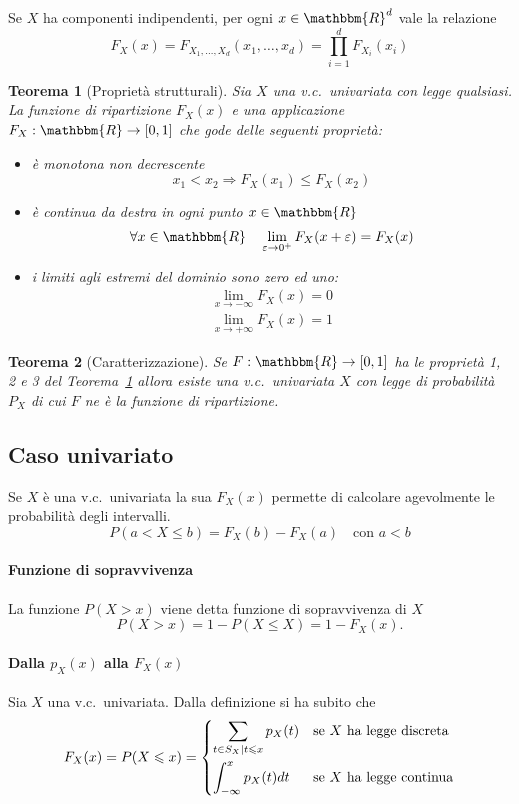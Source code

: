 \documentclass[11pt,a4paper,twoside]{article}
\newtheorem{theorem}{Teorema}
\let\epsilon\varepsilon%
\let\leq\leqslant%
\newcommand\R{\mathbbm{R}}
\begin{document}
Se \(X\) ha componenti indipendenti, per ogni \(x\in\R^d\) vale la
relazione
\[
  F_X(x) = F_{X_1,\dots,X_d} (x_1, \dots, x_d) = \prod_{i=1}^d F_{X_i}(x_i)
\]

\begin{theorem}[Proprietà strutturali]\label{th:proprietà-strutturali}
  Sia \(X\) una v.c.\ univariata con legge qualsiasi.  La funzione di
  ripartizione \(F_X(x)\) e una applicazione \(F_X : \R\to [0,1]\) che
  gode delle seguenti proprietà:
  \begin{itemize}
  \item è monotona non decrescente
    \[ x_1 < x_2 \Rightarrow F_X(x_1) \leq F_X(x_2) \]
  \item è continua da destra in ogni punto \(x\in\R\)
    \[ \forall x\in\R \quad \lim_{\epsilon\to 0^+} F_X(x+\epsilon) = F_X(x) \]
  \item i limiti agli estremi del dominio sono zero ed uno:
    \begin{align*}
      \lim_{x\to -\infty} F_X(x) = 0 \\
      \lim_{x\to +\infty} F_X(x) = 1
    \end{align*}
  \end{itemize}
\end{theorem}

\begin{theorem}[Caratterizzazione]\label{teorema-di-caratterizzazione}
  Se \(F : \R\to[0,1]\) ha le proprietà 1, 2 e 3 del
  Teorema~\ref{th:proprietà-strutturali} allora esiste una v.c.\
  univariata \(X\) con legge di probabilità \(P_X\) di cui \(F\) ne è
  la funzione di ripartizione.
\end{theorem}

\subsection{Caso univariato}
Se \(X\) è una v.c.\ univariata la sua \(F_X(x)\) permette di
calcolare agevolmente le probabilità degli intervalli.
\[
  P(a < X \leq b) = F_X(b) - F_X(a) \quad\mbox{con } a < b
\]

\paragraph{Funzione di sopravvivenza} La funzione \(P(X>x)\) viene
detta funzione di sopravvivenza di \(X\)
\[
  P(X>x) = 1 - P(X\leq X) = 1 - F_X(x).
\]

\paragraph{Dalla \(p_X(x)\) alla \(F_X(x)\)} Sia \(X\) una v.c.\
univariata.  Dalla definizione si ha subito che
\[
  F_X(x) = P(X\leq x) = \begin{dcases}
    \sum_{t\in S_X \mid t\leq x} p_X(t) & \mbox{se \(X\) ha legge discreta} \\
    \int_{-\infty}^x p_X(t) dt & \mbox{se \(X\) ha legge continua}
  \end{dcases}
\]
\end{document}
